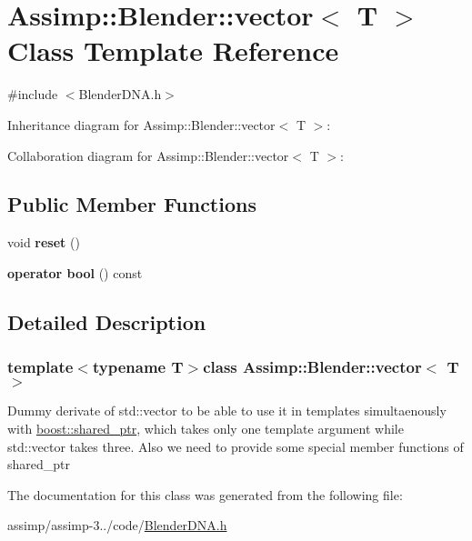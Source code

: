 \hypertarget{class_assimp_1_1_blender_1_1vector}{\section{Assimp\+:\+:Blender\+:\+:vector$<$ T $>$ Class Template Reference}
\label{class_assimp_1_1_blender_1_1vector}
}


{\ttfamily \#include $<$Blender\+D\+N\+A.\+h$>$}



Inheritance diagram for Assimp\+:\+:Blender\+:\+:vector$<$ T $>$\+:


Collaboration diagram for Assimp\+:\+:Blender\+:\+:vector$<$ T $>$\+:
\subsection*{Public Member Functions}
\begin{DoxyCompactItemize}
\item 
\hypertarget{class_assimp_1_1_blender_1_1vector_afa59ffc4e1f3c3002f11c3c9f5b5d8c3}{void {\bfseries reset} ()}\label{class_assimp_1_1_blender_1_1vector_afa59ffc4e1f3c3002f11c3c9f5b5d8c3}

\item 
\hypertarget{class_assimp_1_1_blender_1_1vector_a2e3ee3773670443b9da9f0b140133346}{{\bfseries operator bool} () const }\label{class_assimp_1_1_blender_1_1vector_a2e3ee3773670443b9da9f0b140133346}

\end{DoxyCompactItemize}


\subsection{Detailed Description}
\subsubsection*{template$<$typename T$>$class Assimp\+::\+Blender\+::vector$<$ T $>$}

Dummy derivate of std\+::vector to be able to use it in templates simultaenously with \hyperlink{classboost_1_1shared__ptr}{boost\+::shared\+\_\+ptr}, which takes only one template argument while std\+::vector takes three. Also we need to provide some special member functions of shared\+\_\+ptr 

The documentation for this class was generated from the following file\+:\begin{DoxyCompactItemize}
\item 
assimp/assimp-\/3../code/\hyperlink{_blender_d_n_a_8h}{Blender\+D\+N\+A.\+h}\end{DoxyCompactItemize}
